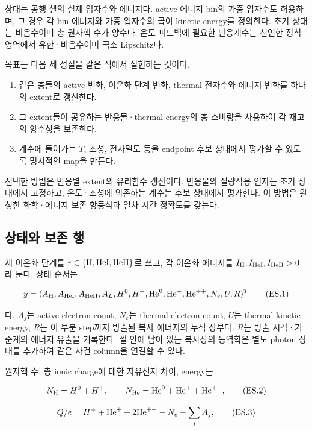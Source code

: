 \documentclass[11pt,a4paper]{article}
\providecommand{\tightlist}{\setlength{\itemsep}{2pt}\setlength{\parskip}{0pt}}
\begin{document}
상태는 공행 셀의 실제 입자수와 에너지다. active 에너지 bin의 가중 입자수도 허용하며, 그 경우 각 bin 에너지와 가중 입자수의 곱이 kinetic energy를 정의한다. 초기 상태는 비음수이며 총 원자핵 수가 양수다. 온도 피드백에 필요한 반응계수는 선언한 정칙 영역에서 유한·비음수이며 국소 Lipschitz다.

목표는 다음 세 성질을 같은 식에서 실현하는 것이다.

\begin{enumerate}
\def\labelenumi{\arabic{enumi}.}
\tightlist
\item
  같은 충돌의 active 변화, 이온화 단계 변화, thermal 전자수와 에너지 변화를 하나의 extent로 갱신한다.
\item
  그 extent들이 공유하는 반응물·thermal energy의 총 소비량을 사용하여 각 재고의 양수성을 보존한다.
\item
  계수에 들어가는 \(T\), 조성, 전자밀도 등을 endpoint 후보 상태에서 평가할 수 있도록 명시적인 map을 만든다.
\end{enumerate}

선택한 방법은 반응별 extent의 유리함수 갱신이다. 반응물의 질량작용 인자는 초기 상태에서 고정하고, 온도·조성에 의존하는 계수는 후보 상태에서 평가한다. 이 방법은 완성한 화학·에너지 보존 항등식과 일차 시간 정확도를 갖는다.

\hypertarget{uxc0c1uxd0dcuxc640-uxbcf4uxc874-uxd589}{%
\subsection{상태와 보존 행}\label{uxc0c1uxd0dcuxc640-uxbcf4uxc874-uxd589}}

세 이온화 단계를 \(r\in\{{\rm H},{\rm HeI},{\rm HeII}\}\)로 쓰고, 각 이온화 에너지를 \(I_{\rm H},I_{\rm HeI},I_{\rm HeII}>0\)라 둔다. 상태 순서는

\[
y=(A_{\rm H},A_{\rm HeI},A_{\rm HeII},A_L,
H^0,H^+,{\rm He}^0,{\rm He}^+,{\rm He}^{++},
N_e,U,R)^T
\tag{ES.1}
\]

다. \(A_j\)는 active electron count, \(N_e\)는 thermal electron count, \(U\)는 thermal kinetic energy, \(R\)는 이 부분 step까지 방출된 복사 에너지의 누적 장부다. \(R\)는 방출 시각·기준계의 에너지 유출을 기록한다. 셀 안에 남아 있는 복사장의 동역학은 별도 photon 상태를 추가하여 같은 사건 column을 연결할 수 있다.

원자핵 수, 총 ionic charge에 대한 자유전자 차이, energy는

\[
N_{\rm H}=H^0+H^+,\qquad
N_{\rm He}={\rm He}^0+{\rm He}^++{\rm He}^{++},
\tag{ES.2}
\]

\[
Q/e=H^++{\rm He}^++2{\rm He}^{++}-N_e-\sum_jA_j,
\tag{ES.3}
\]
\end{document}
